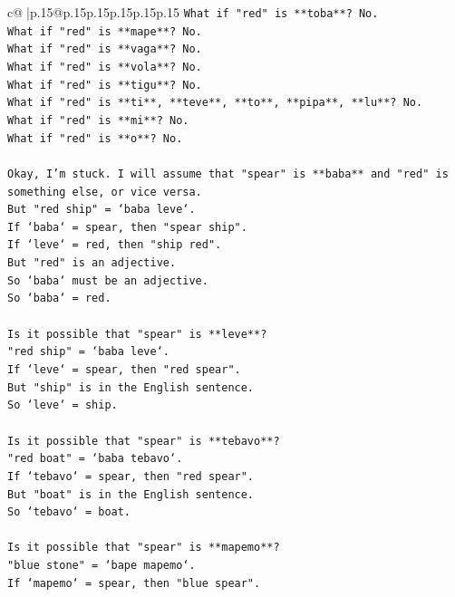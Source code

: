 \documentclass{article}
\begin{document}
{\begin{supertabular}{c@{$\;$}|p{.15\linewidth}@{}p{.15\linewidth}p{.15\linewidth}p{.15\linewidth}p{.15\linewidth}p{.15\linewidth}}
{{{\texttt{What if "red" is **toba**? No.} \\
\texttt{What if "red" is **mape**? No.} \\
\texttt{What if "red" is **vaga**? No.} \\
\texttt{What if "red" is **vola**? No.} \\
\texttt{What if "red" is **tigu**? No.} \\
\texttt{What if "red" is **ti**, **teve**, **to**, **pipa**, **lu**? No.} \\
\texttt{What if "red" is **mi**? No.} \\
\texttt{What if "red" is **o**? No.} \\
\\ 
\texttt{Okay, I'm stuck. I will assume that "spear" is **baba** and "red" is something else, or vice versa.} \\
\texttt{But "red ship" = `baba leve`.} \\
\texttt{If `baba` = spear, then "spear ship".} \\
\texttt{If `leve` = red, then "ship red".} \\
\texttt{But "red" is an adjective.} \\
\texttt{So `baba` must be an adjective.} \\
\texttt{So `baba` = red.} \\
\\ 
\texttt{Is it possible that "spear" is **leve**?} \\
\texttt{"red ship" = `baba leve`.} \\
\texttt{If `leve` = spear, then "red spear".} \\
\texttt{But "ship" is in the English sentence.} \\
\texttt{So `leve` = ship.} \\
\\ 
\texttt{Is it possible that "spear" is **tebavo**?} \\
\texttt{"red boat" = `baba tebavo`.} \\
\texttt{If `tebavo` = spear, then "red spear".} \\
\texttt{But "boat" is in the English sentence.} \\
\texttt{So `tebavo` = boat.} \\
\\ 
\texttt{Is it possible that "spear" is **mapemo**?} \\
\texttt{"blue stone" = `bape mapemo`.} \\
\texttt{If `mapemo` = spear, then "blue spear".} \\
}}}
\end{supertabular}}
\end{document}
